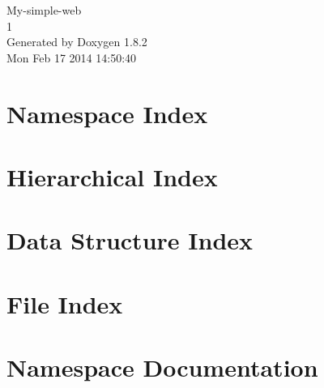 \documentclass{book}
\begin{document}
\hypersetup{pageanchor=false,citecolor=blue}
\begin{titlepage}
\vspace*{7cm}
\begin{center}
{\Large My-\/simple-\/web \\[1ex]\large 1 }\\
\vspace*{1cm}
{\large Generated by Doxygen 1.8.2}\\
\vspace*{0.5cm}
{\small Mon Feb 17 2014 14:50:40}\\
\end{center}
\end{titlepage}
\clearemptydoublepage
{}
\tableofcontents
\clearemptydoublepage
{}
\hypersetup{pageanchor=true,citecolor=blue}
\chapter{Namespace Index}

\chapter{Hierarchical Index}

\chapter{Data Structure Index}

\chapter{File Index}

\chapter{Namespace Documentation}












\end{document}

